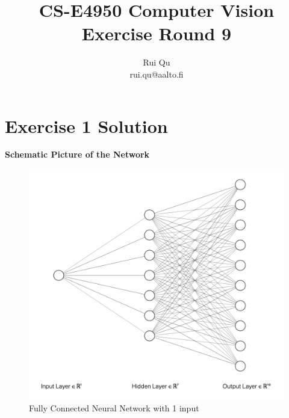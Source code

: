 \documentclass{article}
\begin{document}
\title{CS-E4950 Computer Vision\\Exercise Round 9}                  
\author{Rui Qu\\rui.qu@aalto.fi}
\maketitle



\section*{Exercise 1 Solution}
\textbf{Schematic Picture of the Network}\footnotemark[1]

\begin{figure}[H]
\centering  
\includegraphics[scale=0.6]{nn.png}
\caption{Fully Connected Neural Network with 1 input}
\label{fig: label}
\end{figure}
\end{document}
